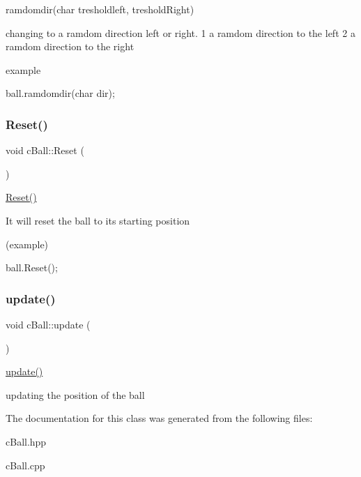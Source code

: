 ramdomdir(char tresholdleft, treshold\+Right) 

changing to a ramdom direction left or right. 1 a ramdom direction to the left 2 a ramdom direction to the right

\begin{DoxyParagraph}{example}

\begin{DoxyCode}
ball.ramdomdir(\textcolor{keywordtype}{char} dir);
\end{DoxyCode}
 
\end{DoxyParagraph}
\mbox{\label{classc_ball_a7c7b2cda898f6e1670faa2f753b9c420}} 
\subsubsection{\texorpdfstring{Reset()}{Reset()}}
{\footnotesize\ttfamily void c\+Ball\+::\+Reset (\begin{DoxyParamCaption}{ }\end{DoxyParamCaption})}



\mbox{\hyperlink{classc_ball_a7c7b2cda898f6e1670faa2f753b9c420}{Reset()}} 

It will reset the ball to its starting position

(example) 
\begin{DoxyCode}
ball.Reset();
\end{DoxyCode}
 \mbox{\label{classc_ball_acbdd0fa42ab6efd934d4966f3bf2e411}} 
\subsubsection{\texorpdfstring{update()}{update()}}
{\footnotesize\ttfamily void c\+Ball\+::update (\begin{DoxyParamCaption}{ }\end{DoxyParamCaption})}



\mbox{\hyperlink{classc_ball_acbdd0fa42ab6efd934d4966f3bf2e411}{update()}} 

updating the position of the ball 

The documentation for this class was generated from the following files\+:\begin{DoxyCompactItemize}
\item 
c\+Ball.\+hpp\item 
c\+Ball.\+cpp\end{DoxyCompactItemize}
